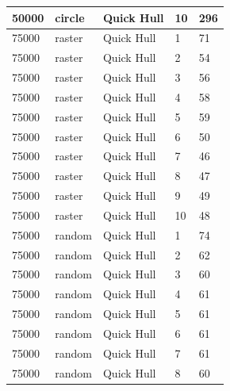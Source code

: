 \documentclass[12pt]{article}
\begin{document}
\begin{longtable}{|l|l|l|l|l|}
50000        & circle            & Quick Hull & 10         & 296                           \\ \hline
75000        & raster            & Quick Hull & 1          & 71                            \\ \hline
75000        & raster            & Quick Hull & 2          & 54                            \\ \hline
75000        & raster            & Quick Hull & 3          & 56                            \\ \hline
75000        & raster            & Quick Hull & 4          & 58                            \\ \hline
75000        & raster            & Quick Hull & 5          & 59                            \\ \hline
75000        & raster            & Quick Hull & 6          & 50                            \\ \hline
75000        & raster            & Quick Hull & 7          & 46                            \\ \hline
75000        & raster            & Quick Hull & 8          & 47                            \\ \hline
75000        & raster            & Quick Hull & 9          & 49                            \\ \hline
75000        & raster            & Quick Hull & 10         & 48                            \\ \hline
75000        & random            & Quick Hull & 1          & 74                            \\ \hline
75000        & random            & Quick Hull & 2          & 62                            \\ \hline
75000        & random            & Quick Hull & 3          & 60                            \\ \hline
75000        & random            & Quick Hull & 4          & 61                            \\ \hline
75000        & random            & Quick Hull & 5          & 61                            \\ \hline
75000        & random            & Quick Hull & 6          & 61                            \\ \hline
75000        & random            & Quick Hull & 7          & 61                            \\ \hline
75000        & random            & Quick Hull & 8          & 60                            \\ \hline

\end{longtable}
\end{document}
